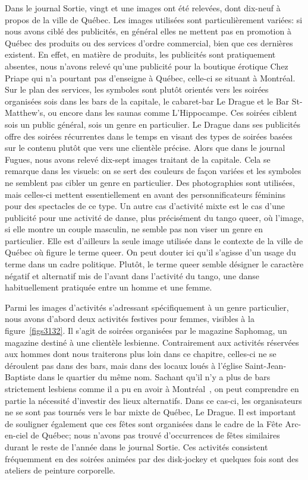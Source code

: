 Dans le journal Sortie, vingt et une images ont été relevées, dont dix-neuf à propos de la ville de Québec. 
Les images utilisées sont particulièrement variées: si nous avons ciblé des publicités, en général elles ne mettent pas en promotion à Québec des produits ou des services d'ordre commercial, bien que ces dernières existent. 
En effet, en matière de produits, les publicités sont pratiquement absentes, nous n'avons relevé qu'une publicité pour la boutique érotique Chez Priape qui n'a pourtant pas d'enseigne à Québec, celle-ci se situant à Montréal. 
Sur le plan des services, les symboles sont plutôt orientés vers les soirées organisées sois dans les bars de la capitale, le cabaret-bar Le Drague et le Bar St-Matthew’s, ou encore dans les saunas comme L'Hippocampe. 
Ces soirées ciblent sois un public général, sois un genre en particulier. 
Le Drague dans ses publicités offre des soirées récurrentes dans le temps en visant des types de soirées basées sur le contenu plutôt que vers une clientèle précise. 
Alors que dans le journal Fugues, nous avons relevé dix-sept images traitant de la capitale. 
Cela se remarque dans les visuels: on se sert des couleurs de façon variées et les symboles ne semblent pas cibler un genre en particulier. 
Des photographies sont utilisées, mais celles-ci mettent essentiellement en avant des personnificateurs féminins pour des spectacles de ce type. 
Un autre cas d'activité mixte est le cas d'une publicité pour une activité de danse, plus précisément du tango queer, où l'image, si elle montre un couple masculin, ne semble pas non viser un genre en particulier. 
Elle est d'ailleurs la seule image utilisée dans le contexte de la ville de Québec où figure le terme queer.
On peut douter ici qu'il s'agisse d'un usage du terme dans un cadre politique. Plutôt, le terme queer semble désigner le caractère négatif et alternatif mis de l'avant dans l'activité du tango, une danse habituellement pratiquée entre un homme et une femme.

Parmi les images d'activités s'adressant spécifiquement à un genre particulier, nous avons d'abord deux activités festives pour femmes, visibles à la figure~\ref{figs3132}. 
Il s'agit de soirées organisées par le magazine Saphomag, un magazine destiné à une clientèle lesbienne. 
Contrairement aux activités réservées aux hommes dont nous traiterons plus loin dans ce chapitre, celles-ci ne se déroulent pas dans des bars, mais dans des locaux loués à l'église Saint-Jean-Baptiste dans le quartier du même nom. 
Sachant qu'il n'y a plus de bars strictement lesbiens comme il a pu en avoir à Montréal~\citep{Podmore2006}, on peut comprendre en partie la nécessité d'investir des lieux alternatifs. Dans ce cas-ci, les organisateurs ne se sont pas tournés vers le bar mixte de Québec, Le Drague. 
Il est important de souligner également que ces fêtes sont organisées dans le cadre de la Fête Arc-en-ciel de Québec; nous n'avons pas trouvé d'occurrences de fêtes similaires durant le reste de l'année dans le journal Sortie. 
Ces activités consistent fréquemment en des soirées animées par des disk-jockey et quelques fois sont des ateliers de peinture corporelle.

